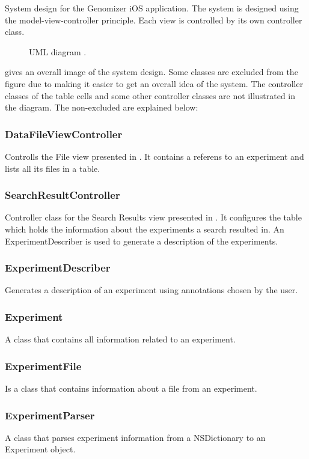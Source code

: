 System design for the Genomizer iOS application. The  system is designed using the model-view-controller principle. Each view is controlled by its own controller class.
\begin{figure}[ht]
\caption{UML diagram .}
\label{fig:ios_UML}
\end{figure}

 gives an overall image of the system design. Some classes are excluded from the figure due to making it easier to get an overall idea of the system. The controller classes of the table cells and some other controller classes are not illustrated in the diagram. The non-excluded are explained below:

\FloatBarrier
\subsubsection{DataFileViewController}
Controlls the File view presented in . It contains a referens to an experiment and lists all its files in a table.

\subsubsection{SearchResultController}
Controller class for the Search Results view presented in  . It configures the table which holds the information about the experiments a search resulted in. An ExperimentDescriber is used to generate a description of the experiments.

\subsubsection{ExperimentDescriber}
Generates a description of an experiment using annotations chosen by the user.

\subsubsection{Experiment}
A class that contains all information related to an experiment.

\subsubsection{ExperimentFile}
Is a class that contains information about a file from an experiment.

\subsubsection{ExperimentParser}
A class that parses experiment information from a NSDictionary to an Experiment object.

